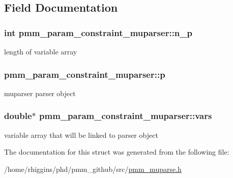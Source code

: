 \subsection{Field Documentation}
\hypertarget{structpmm__param__constraint__muparser_ad9d429b167ea7f345c0cda4e41ded404}{
\subsubsection[{n\-\_\-p}]{\setlength{\rightskip}{0pt plus 5cm}int pmm\-\_\-param\-\_\-constraint\-\_\-muparser\-::n\-\_\-p}}\label{structpmm__param__constraint__muparser_ad9d429b167ea7f345c0cda4e41ded404}
length of variable array \hypertarget{structpmm__param__constraint__muparser_a670f84c0b0d20f80250c52744886bd09}{
\subsubsection[{p}]{ pmm\-\_\-param\-\_\-constraint\-\_\-muparser\-::p}}\label{structpmm__param__constraint__muparser_a670f84c0b0d20f80250c52744886bd09}
muparser parser object \hypertarget{structpmm__param__constraint__muparser_ad85004e88259f4d0e9549babd77dfd2a}{
\subsubsection[{vars}]{\setlength{\rightskip}{0pt plus 5cm}double$\ast$ pmm\-\_\-param\-\_\-constraint\-\_\-muparser\-::vars}}\label{structpmm__param__constraint__muparser_ad85004e88259f4d0e9549babd77dfd2a}
variable array that will be linked to parser object 

The documentation for this struct was generated from the following file\-:\begin{DoxyCompactItemize}
\item 
/home/rhiggins/phd/pmm\-\_\-github/src/\hyperlink{pmm__muparse_8h}{pmm\-\_\-muparse.\-h}\end{DoxyCompactItemize}
